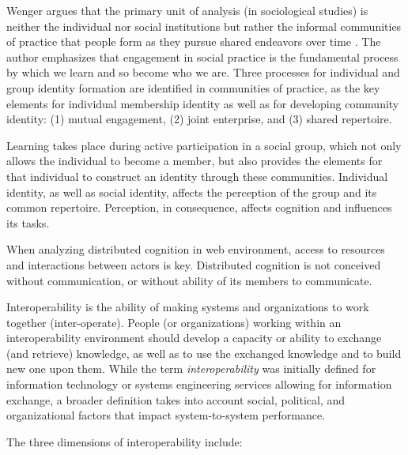 \documentclass[10pt,twocolumn,ieeetran]{article}
\begin{document}

Wenger \cite{Wenger} argues that the primary unit of analysis (in sociological studies) is neither the individual nor social institutions but rather the informal communities of practice that people form as they pursue shared endeavors over time \cite{Wenger}. The author emphasizes that engagement in social practice is the fundamental process by which we learn and so become who we are. Three processes for individual and group identity formation are identified in communities of practice, as the key elements for individual membership identity as well as for developing community identity: (1) mutual engagement, (2) joint enterprise, and
(3) shared repertoire.


Learning takes place during active participation in a social group, which not only allows the individual to become a member, but also provides the elements for that individual to construct an identity through these communities. Individual identity, as well as social identity, affects the perception of the group and its common repertoire. Perception, in consequence, affects cognition and influences  its tasks.


When analyzing distributed
cognition in web environment, access to resources and interactions between actors is key. Distributed cognition
is not conceived without communication, or without ability of its members to communicate.

Interoperability is the ability of making systems and organizations to work together (inter-operate). People (or organizations) working within an interoperability environment should develop a capacity or ability to exchange (and retrieve) knowledge, as well as to use the exchanged knowledge and to build new one upon them. 
While the term {\it interoperability} was initially defined for information technology or systems engineering services  allowing for information exchange, a broader definition takes into account social, political, and organizational factors that impact system-to-system performance.

The three dimensions of interoperability include:
\end{document}
